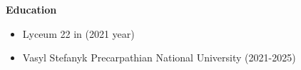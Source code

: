 {\vspace{1cm} \hspace{-1cm} \Large \textbf{Education}}

\begin{itemize}
    \item Lyceum 22 in (2021 year)
    \item Vasyl Stefanyk Precarpathian National University (2021-2025)
\end{itemize}